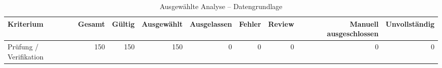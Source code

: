 \begin{table}[htbp]
\centering
\caption{Ausgewählte Analyse -- Datengrundlage}
\begin{tabular}{lrrrrrrrr}
\toprule
Kriterium & Gesamt & Gültig & Ausgewählt & Ausgelassen & Fehler & Review & Manuell ausgeschlossen & Unvollständig \\
\midrule
Prüfung / Verifikation & 150 & 150 & 150 & 0 & 0 & 0 & 0 & 0 \\
\bottomrule
\end{tabular}
\end{table}
